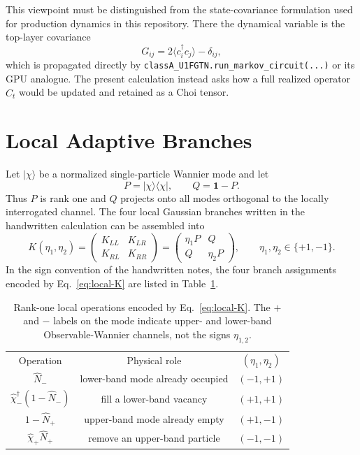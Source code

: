 \documentclass[aps,prb,onecolumn,nofootinbib,superscriptaddress]{revtex4-2}
\newcommand{\I}{\mathbf{1}}
\newcommand{\ket}[1]{\lvert #1\rangle}
\newcommand{\bra}[1]{\langle #1\rvert}
\theoremstyle{plain}
\theoremstyle{definition}
\begin{document}
This viewpoint must be distinguished from the state-covariance formulation
used for production dynamics in this repository.  There the dynamical variable
is the top-layer covariance
\begin{equation}
  G_{ij}=2\langle c_i^\dagger c_j\rangle-\delta_{ij},
  \label{eq:G-convention}
\end{equation}
which is propagated directly by
\texttt{classA\_U1FGTN.run\_markov\_circuit(...)} or its GPU analogue.
The present calculation instead asks how a full realized operator
\(\hat C_t\) would be updated and retained as a Choi tensor.

\section{Local Adaptive Branches}

Let \(\ket{\chi}\) be a normalized single-particle Wannier mode and let
\begin{equation}
  P=\ket{\chi}\bra{\chi},
  \qquad
  Q=\I-P.
  \label{eq:PQ}
\end{equation}
Thus \(P\) is rank one and \(Q\) projects onto all modes orthogonal to the
locally interrogated channel.  The four local Gaussian branches written in
the handwritten calculation can be assembled into
\begin{equation}
  K(\eta_1,\eta_2)
  =
  \begin{pmatrix}
    K_{LL} & K_{LR}\\
    K_{RL} & K_{RR}
  \end{pmatrix}
  =
  \begin{pmatrix}
    \eta_1P & Q\\
    Q & \eta_2P
  \end{pmatrix},
  \qquad
  \eta_1,\eta_2\in\{+1,-1\}.
  \label{eq:local-K}
\end{equation}
In the sign convention of the handwritten notes, the four branch assignments
encoded by Eq.~\eqref{eq:local-K} are listed in Table~\ref{tab:branches}.
\begin{table}[b]
  \caption{\label{tab:branches}
  Rank-one local operations encoded by Eq.~\eqref{eq:local-K}.  The
  \(+\) and \(-\) labels on the mode indicate upper- and lower-band
  Observable-Wannier channels, not the signs \(\eta_{1,2}\).}
  \begin{ruledtabular}
  \begin{tabular}{ccc}
  Operation & Physical role & \((\eta_1,\eta_2)\)\\
  \colrule
  \(\hat N_-\) &
  lower-band mode already occupied & \((-1,+1)\)\\
  \(\hat\chi_-^\dagger(1-\hat N_-)\) &
  fill a lower-band vacancy & \((+1,+1)\)\\
  \(1-\hat N_+\) &
  upper-band mode already empty & \((+1,-1)\)\\
  \(\hat\chi_+\hat N_+\) &
  remove an upper-band particle & \((-1,-1)\)
  \end{tabular}
  \end{ruledtabular}
\end{table}
\end{document}
